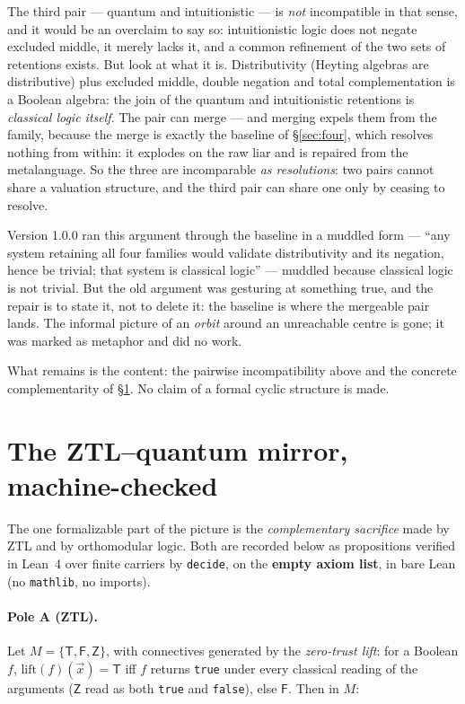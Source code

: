 \documentclass[11pt]{article}
\theoremstyle{remark}
\newcommand{\T}{\mathsf{T}}
\newcommand{\F}{\mathsf{F}}
\newcommand{\Zmark}{\mathsf{Z}}
\begin{document}
The third pair --- quantum and intuitionistic --- is \emph{not} incompatible
in that sense, and it would be an overclaim to say so: intuitionistic logic
does not negate excluded middle, it merely lacks it, and a common refinement
of the two sets of retentions exists. But look at what it is. Distributivity
(Heyting algebras are distributive) plus excluded middle, double negation
and total complementation is a Boolean algebra: the join of the quantum and
intuitionistic retentions is \emph{classical logic itself}. The pair can
merge --- and merging expels them from the family, because the merge is
exactly the baseline of \S\ref{sec:four}, which resolves nothing from
within: it explodes on the raw liar and is repaired from the metalanguage.
So the three are incomparable \emph{as resolutions}: two pairs cannot share
a valuation structure, and the third pair can share one only by ceasing to
resolve.

Version 1.0.0 ran this argument through the baseline in a muddled form ---
``any system retaining all four families would validate distributivity and
its negation, hence be trivial; that system is classical logic'' --- muddled
because classical logic is not trivial. But the old argument was gesturing at
something true, and the repair is to state it, not to delete it: the baseline
is where the mergeable pair lands. The informal picture of an \emph{orbit}
around an unreachable centre is gone; it was marked as metaphor and did no
work.

What remains is the content: the pairwise incompatibility above and the
concrete complementarity of \S\ref{sec:mirror}. No claim of a formal cyclic
structure is made.

\section{The ZTL--quantum mirror, machine-checked}\label{sec:mirror}

The one formalizable part of the picture is the \emph{complementary sacrifice}
made by ZTL and by orthomodular logic. Both are recorded below as
propositions verified in Lean~4 over finite carriers by \texttt{decide}, on
the \textbf{empty axiom list}, in bare Lean (no \texttt{mathlib}, no imports).

\paragraph{Pole A (ZTL).} Let $M = \{\T, \F, \Zmark\}$, with connectives
generated by the \emph{zero-trust lift}: for a Boolean $f$,
$\mathrm{lift}(f)(\vec{x}) = \T$ iff $f$ returns \texttt{true} under every
classical reading of the arguments ($\Zmark$ read as both \texttt{true} and
\texttt{false}), else $\F$. Then in $M$:
\end{document}
